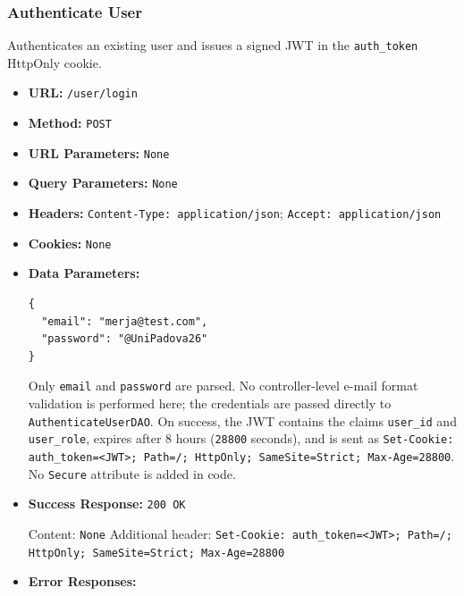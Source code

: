 \subsubsection*{Authenticate User}

Authenticates an existing user and issues a signed JWT in the \texttt{auth\_token} HttpOnly cookie.

\begin{itemize}[nosep]
\item \textbf{URL:} \texttt{/user/login}

\item \textbf{Method:} \texttt{POST}

\item \textbf{URL Parameters:} \texttt{None}

\item \textbf{Query Parameters:} \texttt{None}

\item \textbf{Headers:} \texttt{Content-Type: application/json}; \texttt{Accept: application/json}

\item \textbf{Cookies:} \texttt{None}

\item \textbf{Data Parameters:}

\begin{lstlisting}
{
  "email": "merja@test.com",
  "password": "@UniPadova26"
}
\end{lstlisting}

Only \texttt{email} and \texttt{password} are parsed. No controller-level e-mail format validation is performed here; the credentials are passed directly to \texttt{AuthenticateUserDAO}. On success, the JWT contains the claims \texttt{user\_id} and \texttt{user\_role}, expires after 8 hours (\texttt{28800} seconds), and is sent as \texttt{Set-Cookie: auth\_token=<JWT>; Path=/; HttpOnly; SameSite=Strict; Max-Age=28800}. No \texttt{Secure} attribute is added in code.

\item \textbf{Success Response:} \texttt{200 OK}

Content: \texttt{None} Additional header: \texttt{Set-Cookie: auth\_token=<JWT>; Path=/; HttpOnly; SameSite=Strict; Max-Age=28800}

\item \textbf{Error Responses:}


\end{itemize}
